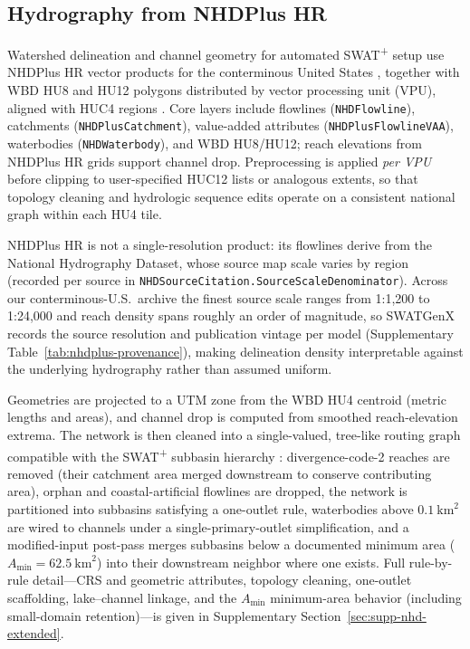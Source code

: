 \subsection{Hydrography from NHDPlus HR}
\label{sec:methods-nhd}

Watershed delineation and channel geometry for automated SWAT\textsuperscript{+} setup use NHDPlus HR vector products for the conterminous United States \citep{Moore2019NHDPlusHR, Moore2025NHDPlusHR}, together with WBD HU8 and HU12 polygons distributed by vector processing unit (VPU), aligned with HUC4 regions \citep{Jones2022WBD}.
Core layers include flowlines (\texttt{NHDFlowline}), catchments (\texttt{NHDPlusCatchment}), value-added attributes (\texttt{NHDPlusFlowlineVAA}), waterbodies (\texttt{NHDWaterbody}), and WBD HU8/HU12; reach elevations from NHDPlus HR grids support channel drop.
Preprocessing is applied \emph{per VPU} before clipping to user-specified HUC12 lists or analogous extents, so that topology cleaning and hydrologic sequence edits operate on a consistent national graph within each HU4 tile.

NHDPlus HR is not a single-resolution product: its flowlines derive from the National Hydrography Dataset, whose source map scale varies by region (recorded per source in \texttt{NHDSourceCitation.SourceScaleDenominator}). Across our conterminous-U.S.\ archive the finest source scale ranges from 1:1,200 to 1:24,000 and reach density spans roughly an order of magnitude, so SWATGenX records the source resolution and publication vintage per model (Supplementary Table~\ref{tab:nhdplus-provenance}), making delineation density interpretable against the underlying hydrography rather than assumed uniform.

Geometries are projected to a UTM zone from the WBD HU4 centroid (metric lengths and areas), and channel drop is computed from smoothed reach-elevation extrema. The network is then cleaned into a single-valued, tree-like routing graph compatible with the SWAT\textsuperscript{+} subbasin hierarchy \citep{Bieger2017SWATPlus}: divergence-code-2 reaches are removed (their catchment area merged downstream to conserve contributing area), orphan and coastal-artificial flowlines are dropped, the network is partitioned into subbasins satisfying a one-outlet rule, waterbodies above $0.1~\mathrm{km}^2$ are wired to channels under a single-primary-outlet simplification, and a modified-input post-pass merges subbasins below a documented minimum area ($A_{\min}=62.5~\mathrm{km}^2$) into their downstream neighbor where one exists. Full rule-by-rule detail---CRS and geometric attributes, topology cleaning, one-outlet scaffolding, lake--channel linkage, and the $A_{\min}$ minimum-area behavior (including small-domain retention)---is given in Supplementary Section~\ref{sec:supp-nhd-extended}.

